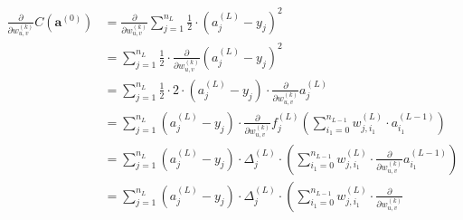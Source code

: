 \documentclass{article}
\begin{document}
          \begin{equation}\label{eqkthpartder0}
            \begin{split}
              \frac{\partial}{\partial w_{u,v}^{(k)}}
                C \left( \mathbf{a}^{(0)} \right)
                  & = \frac{\partial}{\partial w_{u,v}^{(k)}}
                        \sum_{j=1}^{n_L}
                          \frac{1}{2}
                          \cdot
                          \left( a_j^{(L)} - y_j \right)^2 \\
                  & = \sum_{j=1}^{n_L}
                        \frac{1}{2}
                        \cdot
                        \frac{\partial}{\partial w_{u,v}^{(k)}}
                          \left( a_j^{(L)} - y_j \right)^2 \\
                  & = \sum_{j=1}^{n_L}
                        \frac{1}{2}
                        \cdot
                        2
                        \cdot
                        \left( a_j^{(L)} - y_j \right)
                        \cdot
                        \frac{\partial}{\partial w_{u,v}^{(k)}} a_j^{(L)} \\
                  & = \sum_{j=1}^{n_L}
                        \left( a_j^{(L)} - y_j \right)
                        \cdot
                        \frac{\partial}{\partial w_{u,v}^{(k)}}
                          f_j^{(L)} \left(
                            \sum_{i_1=0}^{n_{L-1}}
                              w_{j,i_1}^{(L)}
                              \cdot
                              a_{i_1}^{(L-1)}
                          \right) \\
                  & = \sum_{j=1}^{n_L}
                        \left( a_j^{(L)} - y_j \right)
                        \cdot
                        \Delta_j^{(L)}
                        \cdot
                        \left(
                          \sum_{i_1=0}^{n_{L-1}}
                            w_{j,i_1}^{(L)}
                            \cdot
                            \frac{\partial}{\partial w_{u,v}^{(k)}}
                              a_{i_1}^{(L-1)}
                        \right) \\
                  & = \sum_{j=1}^{n_L}
                        \left( a_j^{(L)} - y_j \right)
                        \cdot
                        \Delta_j^{(L)}
                        \cdot
                        \left(
                          \sum_{i_1=0}^{n_{L-1}}
                            w_{j,i_1}^{(L)}
                            \cdot
                            \frac{\partial}{\partial w_{u,v}^{(k)}}

\end{split}
\end{equation}
\end{document}
